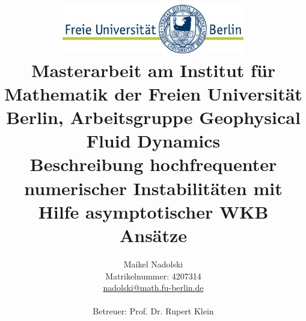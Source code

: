 \documentclass[11pt, a4paper]{report}
\title{\includegraphics[width=0.6\textwidth]{pictures/logo}\\
{\normalsize Masterarbeit am Institut für Mathematik der Freien Universität Berlin, Arbeitsgruppe Geophysical Fluid Dynamics}\\[6ex]
Beschreibung hochfrequenter numerischer Instabilitäten mit Hilfe asymptotischer WKB Ansätze}
\author{Maikel Nadolski\\
{\normalsize Matrikelnummer: 4207314}\\
{\normalsize \href{mailto:nadolski@math.fu-berlin.de}{nadolski@math.fu-berlin.de}}
\vspace{3cm}\\\\
{\normalsize Betreuer: Prof. Dr. Rupert Klein}}
\begin{document}
\begin{titlepage}

\maketitle
\thispagestyle{empty}

\end{titlepage}
\end{document}
